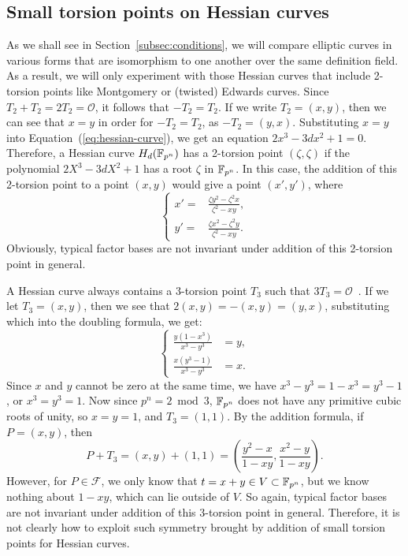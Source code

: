 \subsection{Small torsion points on Hessian curves}
%
As we shall see in Section~\ref{subsec:conditions}, we will compare
elliptic curves in various forms that are isomorphism to one another
over the same definition field.
%
As a result, we will only experiment with those Hessian curves that
include 2-torsion points like Montgomery or (twisted) Edwards curves.
%
Since $T_2+T_2=2T_2=\mathcal O$, it follows that $-T_2=T_2$.
%
If we write $T_2=(x,y)$, then we can see that $x=y$ in order for
$-T_2=T_2$, as $-T_2=(y,x)$.
%
Substituting $x=y$ into Equation~(\ref{eq:hessian-curve}), we get an
equation $2x^3-3dx^2+1=0$.
%
Therefore, a Hessian curve $H_d(\mathbb F_{p^n})$ has a 2-torsion point
$(\zeta,\zeta)$ if the polynomial $2X^3 - 3dX^2 + 1$ has a root
$\zeta$ in $\mathbb F_{p^n}$.
%
In this case, the addition of this 2-torsion point to a point $(x,y)$
would give a point $(x',y')$, where
\[ \left\{\begin{aligned}
x' = & \frac{\zeta y^2 - \zeta^2x}{\zeta^2 - xy}, \\
y' = & \frac{\zeta x^2 - \zeta^2y}{\zeta^2 - xy}.
\end{aligned}\right. \]
%
Obviously, typical factor bases are not invariant under addition of
this 2-torsion point in general.

A Hessian curve always contains a 3-torsion point $T_3$ such that
$3T_3=\mathcal O$~\cite{DBLP:conf/ches/Smart01}.
%
If we let $T_3=(x,y)$, then we see that $2(x,y)=-(x,y)=(y,x)$,
substituting which into the doubling formula, we get:
\[ \left\{\begin{aligned} \frac{y(1-x^3)}{x^3-y^3}&=y, \\
      \frac{x(y^3-1)}{x^3-y^3}&=x. \end{aligned}\right. \]
%
Since $x$ and $y$ cannot be zero at the same time, we have
$x^3-y^3=1-x^3=y^3-1$, or $x^3=y^3=1$.
%
Now since $p^n=2\bmod 3$, $\mathbb F_{p^n}$ does not have any primitive cubic
roots of unity, so $x=y=1$, and $T_3=(1,1)$.
%
By the addition formula, if $P=(x,y)$, then \[
  P+T_3=(x,y)+(1,1)=\left(\frac{y^2-x}{1-xy},\frac{x^2-y}{1-xy}\right). \] 
%
However, for $P\in\mathcal F$, we only know that
$t=x+y\in V\subset\mathbb F_{p^n}$, but we know nothing about $1-xy$, which
can lie outside of $V$.
%
So again, typical factor bases are not invariant under addition of
this 3-torsion point in general.
%
Therefore, it is not clearly how to exploit such symmetry brought by
addition of small torsion points for Hessian curves.

